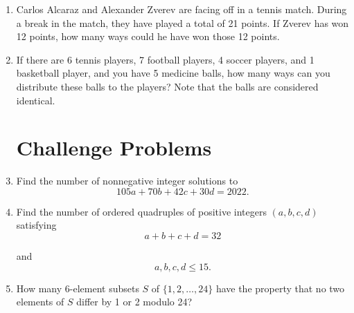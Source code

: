 \documentclass[inline]{article}
\begin{document}
\begin{enumerate}[itemsep=2.85cm]
    \item Carlos Alcaraz and Alexander Zverev are facing off in a tennis match. During a break in the match, they have played a total of 21 points. If Zverev has won 12 points, how many ways could he have won those 12 points.
    \item If there are 6 tennis players, 7 football players, 4 soccer players, and 1 basketball player, and you have 5 medicine balls, how many ways can you distribute these balls to the players? Note that the balls are considered identical.
    
    \section{Challenge Problems}
    \item Find the number of nonnegative integer solutions to
    \[
    105a+70b+42c+30d=2022.
    \]
    \item Find the number of ordered quadruples of positive integers \((a,b,c,d)\) satisfying
\[
a+b+c+d=32
\]

and
\[
a,b,c,d\le15.
\]
    \item How many 6-element subsets \(S\) of \(\{1,2,\ldots,24\}\) have the property that no two elements of \(S\) differ by 1 or 2 modulo 24?
    
    

    
\end{enumerate}
\end{document}
